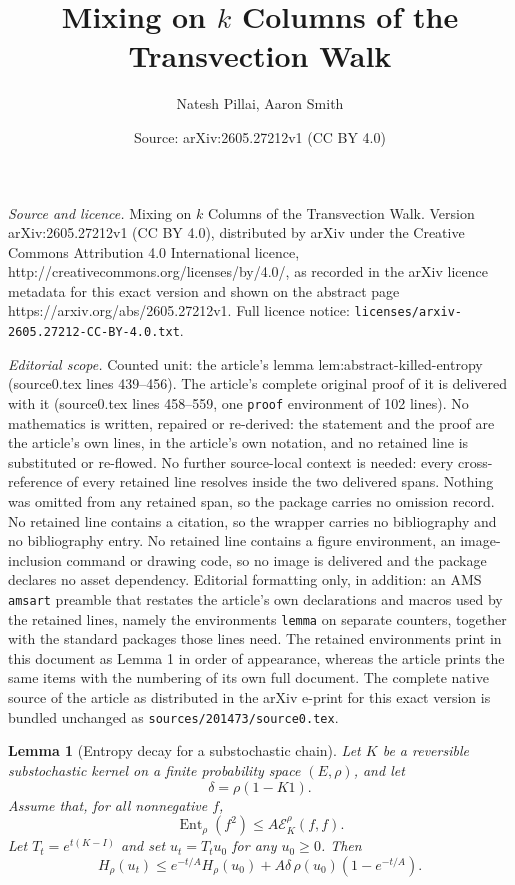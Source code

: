 \documentclass[10pt,a4paper]{amsart}
\title{Mixing on $k$ Columns of the Transvection Walk}
\author{Natesh Pillai, Aaron Smith}
\date{Source: arXiv:2605.27212v1 (CC BY 4.0)}
\newtheorem{lemma}{Lemma}
\newcommand{\Ent}{\operatorname{Ent}}
\newcommand{\cE}{\mathcal E}
\begin{document}
\maketitle

\noindent\emph{Source and licence.} Mixing on $k$ Columns of the Transvection Walk. Version arXiv:2605.27212v1 (CC BY 4.0), distributed by arXiv under the Creative Commons Attribution 4.0 International licence, http://creativecommons.org/licenses/by/4.0/, as recorded in the arXiv licence metadata for this exact version and shown on the abstract page https://arxiv.org/abs/2605.27212v1. Full licence notice: \texttt{licenses/arxiv-2605.27212-CC-BY-4.0.txt}.\par\smallskip

\noindent\textit{Editorial scope.} Counted unit: the article's lemma lem:abstract-killed-entropy (source0.tex lines 439--456). The article's complete original proof of it is delivered with it (source0.tex lines 458--559, one \texttt{proof} environment of 102 lines). No mathematics is written, repaired or re-derived: the statement and the proof are the article's own lines, in the article's own notation, and no retained line is substituted or re-flowed.  No further source-local context is needed: every cross-reference of every retained line resolves inside the two delivered spans.  Nothing was omitted from any retained span, so the package carries no omission record.  No retained line contains a citation, so the wrapper carries no bibliography and no bibliography entry.  No retained line contains a figure environment, an image-inclusion command or drawing code, so no image is delivered and the package declares no asset dependency.  Editorial formatting only, in addition: an AMS \texttt{amsart} preamble that restates the article's own declarations and macros used by the retained lines, namely the environments \texttt{lemma} on separate counters, together with the standard packages those lines need.  The retained environments print in this document as Lemma 1 in order of appearance, whereas the article prints the same items with the numbering of its own full document.  The complete native source of the article as distributed in the arXiv e-print for this exact version is bundled unchanged as \texttt{sources/201473/source0.tex}.
\begin{lemma}[Entropy decay for a substochastic chain]\label{lem:abstract-killed-entropy}
Let \(K\) be a reversible substochastic kernel on a finite probability space
\((E,\rho)\), and let
\[
    \delta=\rho(1-K1).
\]
Assume that, for all nonnegative \(f\),
\begin{equation}\label{eq:abstract-substoch-lsi}
    \Ent_\rho(f^2)\le A\cE_K^\rho(f,f).
\end{equation}
Let \(T_t=e^{t(K-I)}\) and set \(u_t=T_tu_0\) for any \(u_0\ge0\). Then
\begin{equation}\label{eq:abstract-killed-entropy-decay}
    H_\rho(u_t)
    \le
    e^{-t/A}H_\rho(u_0)
    +A\delta\,\rho(u_0)(1-e^{-t/A}).
\end{equation}
\end{lemma}
\end{document}
